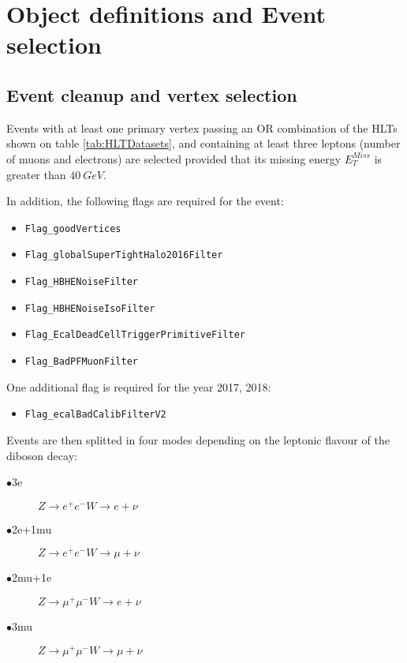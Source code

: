 \section{Object definitions and Event selection}

\subsection{Event cleanup and vertex selection}

Events with at least one primary vertex passing an OR combination
of the HLTs shown on table \ref{tab:HLTDatasets}, and containing at least three
leptons (number of muons and electrons) are selected provided that its
missing energy $E_T^{Miss}$ is greater than $40~GeV$.

In addition, the following flags are required for the event:

\begin{itemize}
  \item \verb|Flag_goodVertices|
  \item \verb|Flag_globalSuperTightHalo2016Filter|
  \item \verb|Flag_HBHENoiseFilter|
  \item \verb|Flag_HBHENoiseIsoFilter|
  \item \verb|Flag_EcalDeadCellTriggerPrimitiveFilter|
  \item \verb|Flag_BadPFMuonFilter|
\end{itemize}

One additional flag is required for the year 2017, 2018:

\begin{itemize}
\item \verb|Flag_ecalBadCalibFilterV2|
\end{itemize}

Events are then splitted in four modes depending on the leptonic flavour of the
diboson decay:

\begin{description}
\item[$\bullet$3e] $Z\rightarrow e^{+}e^{-} W\rightarrow e+\nu$
\item[$\bullet$2e+1mu] $Z\rightarrow e^{+}e^{-} W\rightarrow \mu+\nu$
\item[$\bullet$2mu+1e] $Z\rightarrow \mu^{+}\mu^{-} W\rightarrow e+\nu$
\item[$\bullet$3mu] $Z\rightarrow \mu^{+}\mu^{-} W\rightarrow \mu+\nu$
\end{description}



